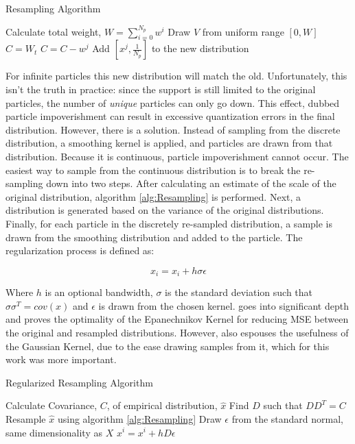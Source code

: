 \begin{algorithm}
\caption{Resampling Algorithm}
\begin{algorithmic}
\STATE Calculate total weight, $W = \sum_{i=0}^{N_p} w^i$
    \STATE Draw $V$ from uniform range $[0, W]$
    \STATE $C = W_t$
        \STATE $C = C - w^j$
    \ENDFOR
    \STATE Add $[x^j, \frac{1}{N_p}]$ to the new distribution
\ENDFOR
\STATE 
\end{algorithmic}
\label{alg:Resampling}
\end{algorithm}
For infinite particles this new distribution will match the old.
Unfortunately, this isn't the truth in practice: since the support is
still limited to the original particles, the number of \emph{unique} particles can only go down.
This effect, dubbed particle impoverishment can result in excessive quantization
errors in the final distribution. However, there is a solution. Instead of sampling from the
discrete distribution, a smoothing kernel is applied, and particles are drawn from
that distribution. Because it is continuous, particle impoverishment
cannot occur. The easiest way to sample from the continuous distribution is to break the 
re-sampling down into two steps. After calculating an estimate of the scale of the original
distribution, algorithm \autoref{alg:Resampling} is performed. Next, a distribution is generated
based on the variance of the original distributions.
Finally, for each particle in the discretely re-sampled distribution, a sample is drawn from 
the smoothing 
distribution and added to the particle.  The regularization process is defined as:

\begin{equation}
x_i = x_i + h\sigma \epsilon
\end{equation}

Where $h$ is an optional bandwidth, $\sigma$ is the standard deviation such that 
$\sigma \sigma^T = cov(x)$
and $\epsilon$ is drawn from the chosen kernel. \cite{Musso2001a} goes into
significant 
depth and proves the optimality of the Epanechnikov Kernel for reducing 
MSE between the original and resampled distributions. However, \cite{Musso2001a}
also espouses the usefulness of the Gaussian Kernel, due to the ease
drawing samples from it, which for this work was more important.

\begin{algorithm}
\caption{Regularized Resampling Algorithm}
\begin{algorithmic}
\STATE Calculate Covariance, $C$, of empirical distribution, $\hat{x}$
\STATE Find $D$ such that $DD^T = C$
\STATE Resample $\hat{x}$ using algorithm \autoref{alg:Resampling}
    \STATE Draw $\epsilon$ from the standard normal, same dimensionality as $X$
    \STATE $x^i = x^i + hD\epsilon$
\ENDFOR
\end{algorithmic}
\label{alg:RegResampling}
\end{algorithm}

